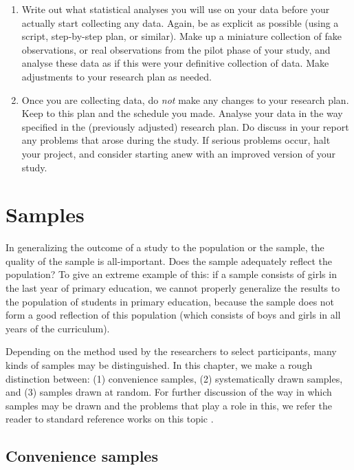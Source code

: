 \documentclass[
]{book}
\begin{document}
\begin{enumerate}
\item
  Write out what statistical analyses you will use on your data before your actually start collecting any data. Again, be as explicit as possible (using a script, step-by-step plan, or similar). Make up a miniature collection of fake observations, or real observations from the pilot phase of your study, and analyse these data as if this were your definitive collection of data. Make adjustments to your research plan as needed.
\item
  Once you are collecting data, do \emph{not} make any changes to your research plan. Keep to this plan and the schedule you made. Analyse your data in the way specified in the (previously adjusted) research plan. Do discuss in your report any problems that arose during the study. If serious problems occur, halt your project, and consider starting anew with an improved version of your study.
\end{enumerate}

\chapter{Samples}\label{ch-samples}

In generalizing the outcome of a study to the population or the sample, the quality of the sample is all-important. Does the sample adequately reflect the population? To give an extreme example of this: if a sample consists of girls in the last year of primary education, we cannot properly generalize the results to the population of students in primary education, because the sample does not form a good reflection of this population (which consists of boys and girls in all years of the curriculum).

Depending on the method used by the researchers to select participants, many kinds of samples may be distinguished. In this chapter, we make a rough distinction between: (1) convenience samples, (2) systematically drawn samples, and (3) samples drawn at random. For further discussion of the way in which samples may be drawn and the problems that play a role in this, we refer the reader to standard reference works on this topic \citep{Coch77, Thom12}.

\section{Convenience samples}\label{sec:convenience-samples}
\end{document}
